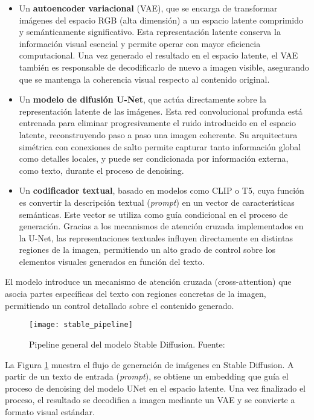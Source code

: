 \begin{itemize}
    \item Un \textbf{autoencoder variacional} (VAE), que se encarga de transformar imágenes del espacio RGB (alta dimensión) a un espacio latente comprimido y semánticamente significativo. Esta representación latente conserva la información visual esencial y permite operar con mayor eficiencia computacional. Una vez generado el resultado en el espacio latente, el VAE también es responsable de decodificarlo de nuevo a imagen visible, asegurando que se mantenga la coherencia visual respecto al contenido original.

    \item Un \textbf{modelo de difusión U-Net}, que actúa directamente sobre la representación latente de las imágenes. Esta red convolucional profunda está entrenada para eliminar progresivamente el ruido introducido en el espacio latente, reconstruyendo paso a paso una imagen coherente. Su arquitectura simétrica con conexiones de salto permite capturar tanto información global como detalles locales, y puede ser condicionada por información externa, como texto, durante el proceso de denoising.

    \item Un \textbf{codificador textual}, basado en modelos como CLIP o T5, cuya función es convertir la descripción textual (\textit{prompt}) en un vector de características semánticas. Este vector se utiliza como guía condicional en el proceso de generación. Gracias a los mecanismos de atención cruzada implementados en la U-Net, las representaciones textuales influyen directamente en distintas regiones de la imagen, permitiendo un alto grado de control sobre los elementos visuales generados en función del texto.
\end{itemize}


El modelo introduce un mecanismo de atención cruzada (cross-attention) que asocia partes específicas del texto con regiones concretas de la imagen, permitiendo un control detallado sobre el contenido generado.


\begin{figure}[H]
    \centering
    \texttt{[image: stable\_pipeline]}
    \caption{Pipeline general del modelo Stable Diffusion. Fuente: \cite{mlc2023walkthrough}}
    \label{fig:sd_pipeline}
\end{figure}

\noindent La Figura \ref{fig:sd_pipeline} muestra el flujo de generación de imágenes en Stable Diffusion. A partir de un texto de entrada (\textit{prompt}), se obtiene un embedding que guía el proceso de denoising del modelo UNet en el espacio latente. Una vez finalizado el proceso, el resultado se decodifica a imagen mediante un VAE y se convierte a formato visual estándar.


